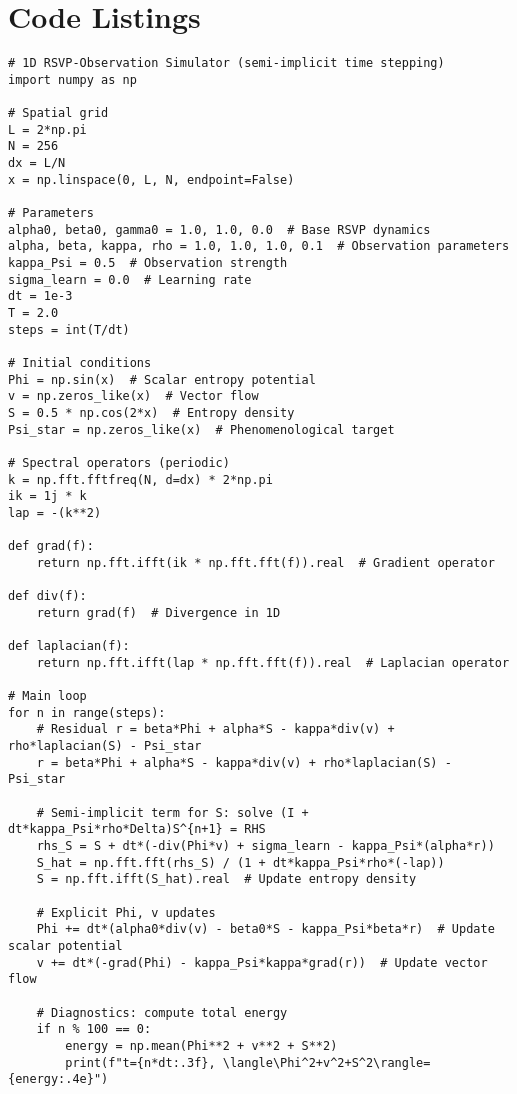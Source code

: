 \documentclass[12pt]{book}
\theoremstyle{definition}
\begin{document}
\chapter{Code Listings}
\label{chap:code}
\begin{lstlisting}[caption={1D RSVP-Observation Simulator}, label={lst:rsvp_code}]
# 1D RSVP-Observation Simulator (semi-implicit time stepping)
import numpy as np

# Spatial grid
L = 2*np.pi
N = 256
dx = L/N
x = np.linspace(0, L, N, endpoint=False)

# Parameters
alpha0, beta0, gamma0 = 1.0, 1.0, 0.0  # Base RSVP dynamics
alpha, beta, kappa, rho = 1.0, 1.0, 1.0, 0.1  # Observation parameters
kappa_Psi = 0.5  # Observation strength
sigma_learn = 0.0  # Learning rate
dt = 1e-3
T = 2.0
steps = int(T/dt)

# Initial conditions
Phi = np.sin(x)  # Scalar entropy potential
v = np.zeros_like(x)  # Vector flow
S = 0.5 * np.cos(2*x)  # Entropy density
Psi_star = np.zeros_like(x)  # Phenomenological target

# Spectral operators (periodic)
k = np.fft.fftfreq(N, d=dx) * 2*np.pi
ik = 1j * k
lap = -(k**2)

def grad(f):
    return np.fft.ifft(ik * np.fft.fft(f)).real  # Gradient operator

def div(f):
    return grad(f)  # Divergence in 1D

def laplacian(f):
    return np.fft.ifft(lap * np.fft.fft(f)).real  # Laplacian operator

# Main loop
for n in range(steps):
    # Residual r = beta*Phi + alpha*S - kappa*div(v) + rho*laplacian(S) - Psi_star
    r = beta*Phi + alpha*S - kappa*div(v) + rho*laplacian(S) - Psi_star

    # Semi-implicit term for S: solve (I + dt*kappa_Psi*rho*Delta)S^{n+1} = RHS
    rhs_S = S + dt*(-div(Phi*v) + sigma_learn - kappa_Psi*(alpha*r))
    S_hat = np.fft.fft(rhs_S) / (1 + dt*kappa_Psi*rho*(-lap))
    S = np.fft.ifft(S_hat).real  # Update entropy density

    # Explicit Phi, v updates
    Phi += dt*(alpha0*div(v) - beta0*S - kappa_Psi*beta*r)  # Update scalar potential
    v += dt*(-grad(Phi) - kappa_Psi*kappa*grad(r))  # Update vector flow

    # Diagnostics: compute total energy
    if n % 100 == 0:
        energy = np.mean(Phi**2 + v**2 + S**2)
        print(f"t={n*dt:.3f}, \langle\Phi^2+v^2+S^2\rangle={energy:.4e}")
\end{lstlisting}
\end{document}

